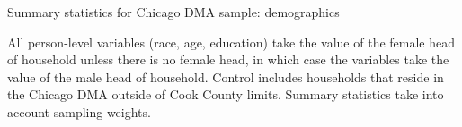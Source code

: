 \documentclass[12pt]{article}
\begin{document}

\singlespacing
\clearpage
\begin{table}
\caption{Summary statistics for Chicago DMA sample: demographics}
\label{summary_table}

\footnotesize{All person-level variables (race, age, education) take the value of the female head of household unless there is no female head, in which case the variables take the value of the male head of household. Control includes households that reside in the Chicago DMA outside of Cook County limits. Summary statistics take into account sampling weights.}
\end{table}


\clearpage


\clearpage


\clearpage


\clearpage


\clearpage


\clearpage


\clearpage


\clearpage


\clearpage



\end{document}

